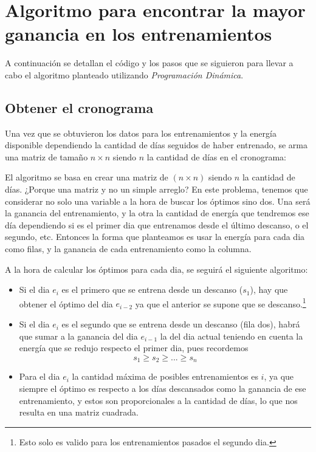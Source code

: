 \section{Algoritmo para encontrar la mayor ganancia en los entrenamientos}

A continuación se detallan el código y los pasos que se siguieron para llevar a cabo el algoritmo planteado utilizando \textit{Programación Dinámica}.

\subsection{Obtener el cronograma}

Una vez que se obtuvieron los datos para los entrenamientos y la energía disponible dependiendo la cantidad de días seguidos de haber entrenado, se arma una matriz de tamaño $n \times n$ siendo $n$ la cantidad de días en el cronograma:



El algoritmo se basa en crear una matriz de $(n \times n)$ siendo $n$ la cantidad de días. ¿Porque una matriz y no un simple arreglo? En este problema, tenemos que considerar no solo una variable a la hora de buscar los óptimos sino dos. Una será la ganancia del entrenamiento, y la otra la cantidad de energía que tendremos ese día dependiendo si es el primer dia que entrenamos desde el último descanso, o el segundo, etc. Entonces la forma que planteamos es usar la energía para cada dia como filas, y la ganancia de cada entrenamiento como la columna.

A la hora de calcular los óptimos para cada dia, se seguirá el siguiente algoritmo:
\begin{itemize}
	\item Si el dia $e_i$ es el primero que se entrena desde un descanso ($s_1$), hay que obtener el óptimo del dia $e_{i-2}$ ya que el anterior se supone que se descanso.\footnote{Esto solo es valido para los entrenamientos pasados el segundo dia.}
	\item Si el dia $e_i$ es el segundo que se entrena desde un descanso (fila dos), habrá que sumar a la ganancia del dia $e_{i-1}$ la del dia actual teniendo en cuenta la energía que se redujo respecto el primer dia, pues recordemos
	\[ s_1 \geq s_2 \geq ... \geq s_n\]
	\item Para el dia $e_i$ la cantidad máxima de posibles entrenamientos es $i$, ya que siempre el óptimo es respecto a los días descansados como la ganancia de ese entrenamiento, y estos son proporcionales a la cantidad de días, lo que nos resulta en una matriz cuadrada.
\end{itemize}


